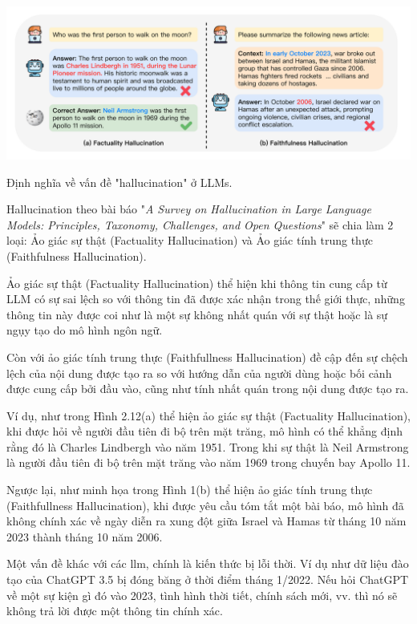\documentclass[a4paper, 12pt, openany]{book}
\begin{document}
\begin{minipage}{\linewidth}
    \centering
    \includegraphics[width=14cm]{./assets/images/hallucination.png}
    \captionsetup{type=figure}
    \caption{Định nghĩa về vấn đề "hallucination" ở LLMs.}
\end{minipage}

Hallucination \cite{huang2023survey} theo bài báo "\textit{A Survey on Hallucination in Large Language Models:
Principles, Taxonomy, Challenges, and Open Questions}" sẽ chia làm 2 loại: Ảo giác sự thật (Factuality Hallucination)
và Ảo giác tính trung thực (Faithfulness Hallucination).

Ảo giác sự thật (Factuality Hallucination) thể hiện khi thông tin cung cấp từ LLM có sự sai lệch
so với thông tin đã được xác nhận trong thế giới thực, những thông tin
này được coi như là một sự không nhất quán với sự thật hoặc là sự ngụy tạo do mô hình ngôn ngữ.

Còn với ảo giác tính trung thực (Faithfullness Hallucination) đề cập đến sự chệch lệch của nội dung được tạo ra so với 
hướng dẫn của người dùng hoặc bối cảnh được cung cấp bởi đầu vào, cũng như tính nhất quán trong nội dung được tạo ra.

Ví dụ, như trong Hình 2.12(a) thể hiện ảo giác sự thật (Factuality Hallucination), khi được hỏi về người đầu tiên đi bộ trên mặt trăng, mô hình có thể khẳng định rằng đó là Charles Lindbergh vào năm 1951.
Trong khi sự thật là Neil Armstrong là người đầu tiên đi bộ trên mặt trăng vào năm 1969 trong chuyến bay Apollo 11. 

Ngược lại, như minh họa trong Hình 1(b) thể hiện ảo giác tính trung thực (Faithfullness Hallucination), khi được yêu cầu tóm tắt một bài báo, mô hình đã không chính xác về ngày diễn ra xung đột giữa Israel và Hamas từ tháng 10 năm 2023 thành tháng 10 năm 2006. 

Một vấn đề khác với các \ac{llm}, chính là kiến thức bị lỗi thời. Ví dụ như dữ liệu đào tạo của ChatGPT 3.5 bị đóng băng ở thời điểm tháng 1/2022. 
Nếu hỏi ChatGPT về một sự kiện gì đó vào 2023, tình hình thời tiết, chính sách mới, vv. thì nó sẽ không trả lời được một thông tin chính xác.
\end{document}
